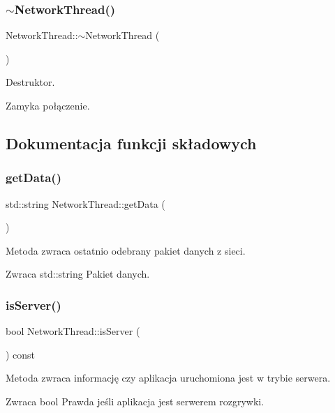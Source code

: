 \subsubsection{$\sim$NetworkThread()}
{\footnotesize\ttfamily Network\+Thread\+::$\sim$\+Network\+Thread (\begin{DoxyParamCaption}{ }\end{DoxyParamCaption})}



Destruktor. 

Zamyka połączenie. 

\subsection{Dokumentacja funkcji składowych}
\mbox{\label{class_network_thread_a00d57a0a9ca68d513c6c2abf4f923366}} 
\subsubsection{getData()}
{\footnotesize\ttfamily std\+::string Network\+Thread\+::get\+Data (\begin{DoxyParamCaption}{ }\end{DoxyParamCaption})}



Metoda zwraca ostatnio odebrany pakiet danych z sieci. 

\begin{DoxyReturn}{Zwraca}
std\+::string Pakiet danych. 
\end{DoxyReturn}
\mbox{\label{class_network_thread_ac448c83c1555e5cd2256f8eb8c3ebf43}} 
\subsubsection{isServer()}
{\footnotesize\ttfamily bool Network\+Thread\+::is\+Server (\begin{DoxyParamCaption}{ }\end{DoxyParamCaption}) const\hspace{0.3cm}{\ttfamily [inline]}}



Metoda zwraca informację czy aplikacja uruchomiona jest w trybie serwera. 

\begin{DoxyReturn}{Zwraca}
bool Prawda jeśli aplikacja jest serwerem rozgrywki. 
\end{DoxyReturn}
\mbox{\label{class_network_thread_a0bbd7bcdabcae675d544da6f03a61a72}} 
